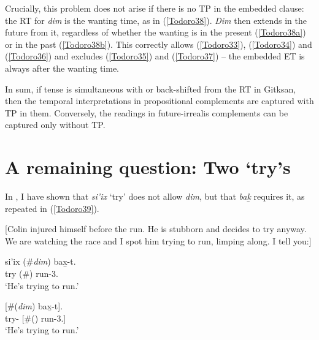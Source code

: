 \documentclass[output=paper]{langscibook}
\begin{document}
Crucially, this problem does not arise if there is no TP in the embedded clause: the RT for \emph{dim} is the wanting time, as in (\ref{Todoro38}). \emph{Dim} then extends in the future from it, regardless of whether the wanting is in the present (\ref{Todoro38a}) or in the past (\ref{Todoro38b}). This correctly allows (\ref{Todoro33}), (\ref{Todoro34}) and (\ref{Todoro36}) and excludes (\ref{Todoro35}) and (\ref{Todoro37}) -- the embedded ET is always after the wanting time.

\begin{exe}
\ex \label{Todoro38}
\begin{xlist}
\ex \label{Todoro38a} 
\ex \label{Todoro38b}
\end{xlist}
\end{exe}

In sum, if tense is simultaneous with or back-shifted from the RT in Gitksan, then the temporal interpretations in propositional complements are captured with TP in them. Conversely, the readings in future-irrealis complements can be captured only without TP.

\section{A remaining question: Two ‘try’s}\label{Todoro:sect5}

In , I have shown that \emph{si’ix} ‘try’ does not allow \emph{dim}, but that \emph{bak̲} requires it, as repeated in (\ref{Todoro39}). 

\begin{exe}
\ex \label{Todoro39} [Colin injured himself before the run. He is stubborn and decides 
    to try anyway. We are watching the race and I spot him trying to     
   run, limping along. I tell you:] \\
\begin{xlist}

\ex \label{Todoro39a}
	{si'ix} 	(\#{\textit{dim}}) 	{bax̱-t}.	  \\
  	try	(\#)	run-3.{\seriesII} \\
\glt `He’s trying to run.' 

\ex \label{Todoro39b}
	[\#({\textit{dim}}) 	{bax̱-t}]. \\
    try-	[\#()	run-3.{\seriesII}]\\
\glt `He’s trying to run.' 
\end{xlist}
\end{exe}
\end{document}
